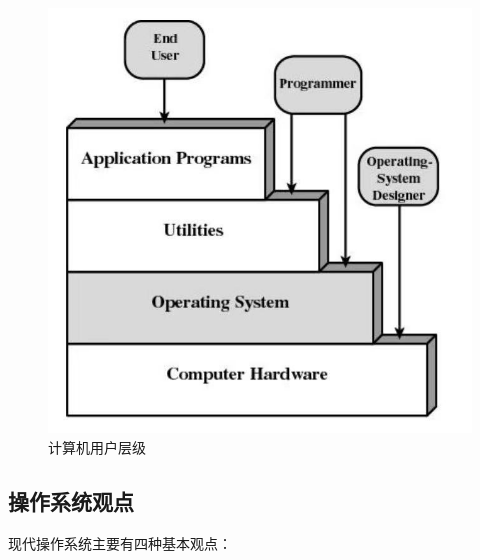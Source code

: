 \begin{figure}[H]
	\centering
	\includegraphics[scale=0.8]{img/C1/1-1/2.png}
	\caption{计算机用户层级}
\end{figure}

\vspace{0.5cm}

\subsection{操作系统观点}

现代操作系统主要有四种基本观点：

